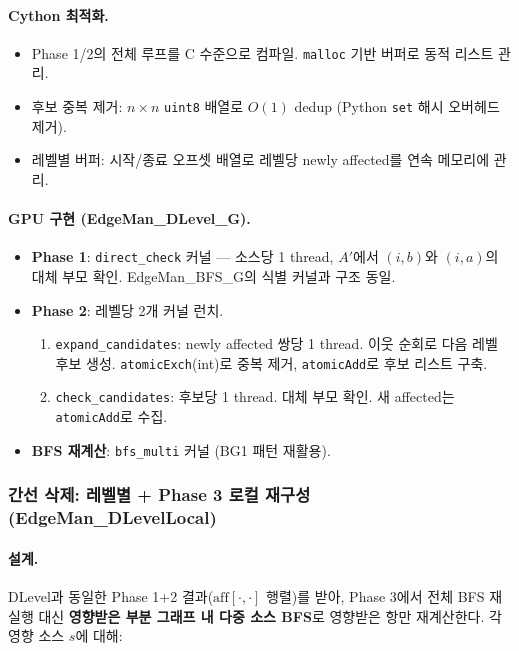 \documentclass[11pt,a4paper]{article}
\begin{document}
\paragraph{Cython 최적화.}
\begin{itemize}[leftmargin=1.4em]
  \item Phase 1/2의 전체 루프를 C 수준으로 컴파일. \texttt{malloc} 기반 버퍼로 동적 리스트 관리.
  \item 후보 중복 제거: $n \times n$ \texttt{uint8} 배열로 $O(1)$ dedup (Python \texttt{set} 해시 오버헤드 제거).
  \item 레벨별 버퍼: 시작/종료 오프셋 배열로 레벨당 newly affected를 연속 메모리에 관리.
\end{itemize}

\paragraph{GPU 구현 (EdgeMan\_DLevel\_G).}
\begin{itemize}[leftmargin=1.4em]
  \item \textbf{Phase 1}: \texttt{direct\_check} 커널 --- 소스당 1 thread, $A'$에서 $(i,b)$와 $(i,a)$의 대체 부모 확인. EdgeMan\_BFS\_G의 식별 커널과 구조 동일.
  \item \textbf{Phase 2}: 레벨당 2개 커널 런치.
    \begin{enumerate}[leftmargin=1.4em]
      \item \texttt{expand\_candidates}: newly affected 쌍당 1 thread. 이웃 순회로 다음 레벨 후보 생성. \texttt{atomicExch}(int)로 중복 제거, \texttt{atomicAdd}로 후보 리스트 구축.
      \item \texttt{check\_candidates}: 후보당 1 thread. 대체 부모 확인. 새 affected는 \texttt{atomicAdd}로 수집.
    \end{enumerate}
  \item \textbf{BFS 재계산}: \texttt{bfs\_multi} 커널 (BG1 패턴 재활용).
\end{itemize}

\subsubsection{간선 삭제: 레벨별 + Phase 3 로컬 재구성 (EdgeMan\_DLevelLocal)}

\paragraph{설계.}
DLevel과 동일한 Phase 1+2 결과($\mathrm{aff}[\cdot,\cdot]$ 행렬)를 받아, Phase 3에서 전체 BFS 재실행 대신 \textbf{영향받은 부분 그래프 내 다중 소스 BFS}로 영향받은 항만 재계산한다. 각 영향 소스 $s$에 대해:
\end{document}
